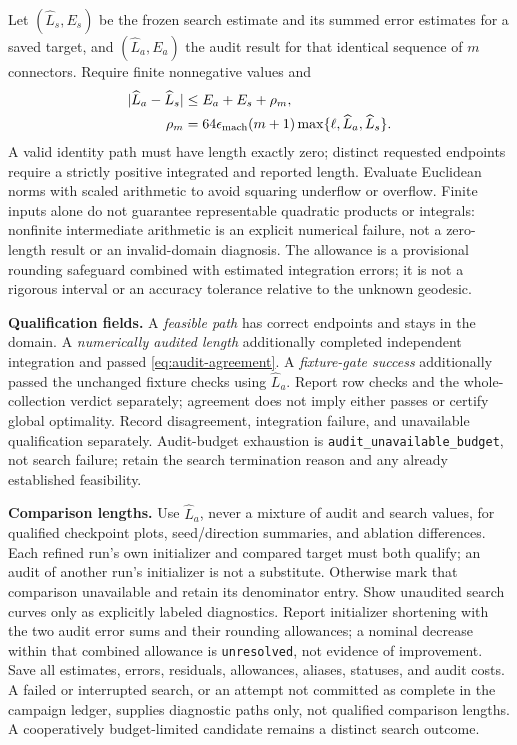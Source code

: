 \documentclass[11pt,letterpaper]{article}
\newcommand{\src}[1]{\nolinkurl{#1}}
\begin{document}
Let $(\widehat L_s,E_s)$ be the frozen search estimate and its summed error estimates for a saved target, and $(\widehat L_a,E_a)$ the audit result for that identical sequence of $m$ connectors. Require finite nonnegative values and
\begin{align}
 |\widehat L_a-\widehat L_s|&\le E_a+E_s+\rho_m,\label{eq:audit-agreement}\\
 \rho_m&=64\epsilon_{\rm mach}(m+1)\max\{\ell,\widehat L_a,\widehat L_s\}.
\end{align}
A valid identity path must have length exactly zero; distinct requested endpoints require a strictly positive integrated and reported length. Evaluate Euclidean norms with scaled arithmetic to avoid squaring underflow or overflow. Finite inputs alone do not guarantee representable quadratic products or integrals: nonfinite intermediate arithmetic is an explicit numerical failure, not a zero-length result or an invalid-domain diagnosis. The allowance is a provisional rounding safeguard combined with estimated integration errors; it is not a rigorous interval or an accuracy tolerance relative to the unknown geodesic.

\textbf{Qualification fields.} A \emph{feasible path} has correct endpoints and stays in the domain. A \emph{numerically audited length} additionally completed independent integration and passed \eqref{eq:audit-agreement}. A \emph{fixture-gate success} additionally passed the unchanged fixture checks using $\widehat L_a$. Report row checks and the whole-collection verdict separately; agreement does not imply either passes or certify global optimality. Record disagreement, integration failure, and unavailable qualification separately. Audit-budget exhaustion is \src{audit_unavailable_budget}, not search failure; retain the search termination reason and any already established feasibility.

\textbf{Comparison lengths.} Use $\widehat L_a$, never a mixture of audit and search values, for qualified checkpoint plots, seed/direction summaries, and ablation differences. Each refined run's own initializer and compared target must both qualify; an audit of another run's initializer is not a substitute. Otherwise mark that comparison unavailable and retain its denominator entry. Show unaudited search curves only as explicitly labeled diagnostics. Report initializer shortening with the two audit error sums and their rounding allowances; a nominal decrease within that combined allowance is \src{unresolved}, not evidence of improvement. Save all estimates, errors, residuals, allowances, aliases, statuses, and audit costs. A failed or interrupted search, or an attempt not committed as complete in the campaign ledger, supplies diagnostic paths only, not qualified comparison lengths. A cooperatively budget-limited candidate remains a distinct search outcome.
\end{document}
